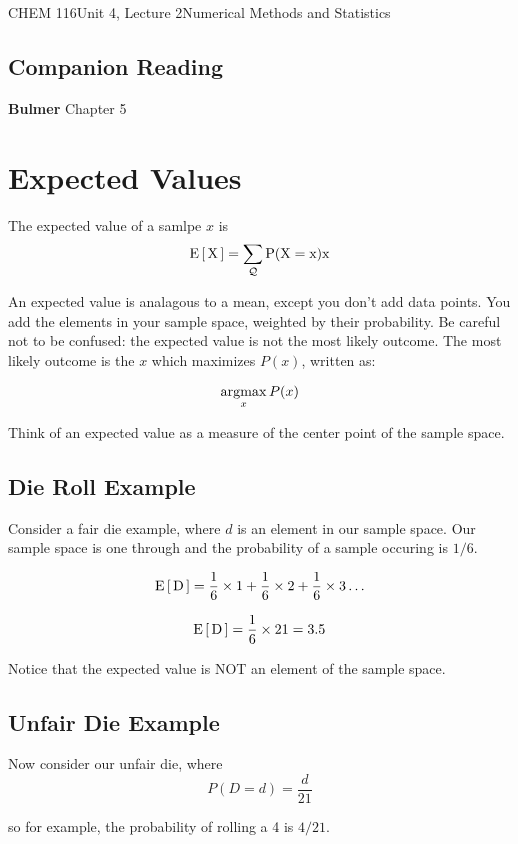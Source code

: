 \documentclass{article}
\begin{document}
\begin{tdoc}{CHEM 116}{Unit 4, Lecture 2}{Numerical Methods and Statistics}


    \subsection*{Companion Reading}
    \textbf{Bulmer} Chapter 5

\section{Expected Values}

The expected value of a samlpe $x$ is
\begin{equation}
\rm{E}\left[\,X\,\right] = \sum_\mathcal{Q} P(X=x)x
\end{equation}

An expected value is analagous to a mean, except you don't add data
points. You add the elements in your sample space, weighted by their
probability. Be careful not to be confused: the expected value is not
the most likely outcome. The most likely outcome is the $x$ which
maximizes $P(x)$, written as:

\begin{equation}
\operatorname*{argmax}_x P(x)
\end{equation}

Think of an expected value as a measure of the center point of the sample space.

\subsection{Die Roll Example}

Consider a fair die example, where $d$ is an element in our sample
space. Our sample space is one through and the probability of a sample
occuring is $1/6$.

\[
\rm{E}\left[\,D\,\right] = \frac{1}{6}\times{}1 + \frac{1}{6}\times{}2 + \frac{1}{6}\times{}3 \ldots
\]

\[
\rm{E}\left[\,D\,\right] = \frac{1}{6}\times 21 = 3.5
\]

Notice that the expected value is NOT an element of the sample space.

\subsection{Unfair Die Example}
Now consider our unfair die, where
\[
P(D = d) = \frac{d}{21}
\]

so for example, the probability of rolling a 4 is $4/21$.


\end{tdoc}
\end{document}
